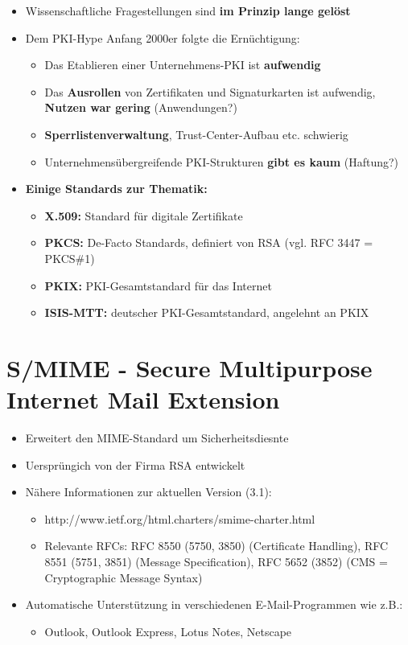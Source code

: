 \documentclass[openany]{book}
\begin{document}
\begin{itemize}
    \item Wissenschaftliche Fragestellungen sind \textbf{im Prinzip lange gelöst}
    \item Dem PKI-Hype Anfang 2000er folgte die Ernüchtigung:
    \begin{itemize}
        \item Das Etablieren einer Unternehmens-PKI ist \textbf{aufwendig}
        \item Das \textbf{Ausrollen} von Zertifikaten und Signaturkarten ist aufwendig, \textbf{Nutzen war gering} (Anwendungen?)
        \item \textbf{Sperrlistenverwaltung}, Trust-Center-Aufbau etc. schwierig
        \item Unternehmensübergreifende PKI-Strukturen \textbf{gibt es kaum} (Haftung?)
    \end{itemize}
    \item \textbf{Einige Standards zur Thematik:}
    \begin{itemize}
        \item \textbf{X.509:} Standard für digitale Zertifikate
        \item \textbf{PKCS:} De-Facto Standards, definiert von RSA (vgl. RFC 3447 = PKCS\#1)
        \item \textbf{PKIX:} PKI-Gesamtstandard für das Internet
        \item \textbf{ISIS-MTT:} deutscher PKI-Gesamtstandard, angelehnt an PKIX
    \end{itemize}
\end{itemize}

\section{S/MIME - Secure Multipurpose Internet Mail Extension}

\begin{itemize}
    \item Erweitert den MIME-Standard um Sicherheitsdiesnte
    \item Uersprüngich von der Firma RSA entwickelt
    \item Nähere Informationen zur aktuellen Version (3.1):
    \begin{itemize}
        \item http://www.ietf.org/html.charters/smime-charter.html
        \item Relevante RFCs: RFC 8550 (5750, 3850) (Certificate Handling), RFC 8551 (5751, 3851) (Message Specification), RFC 5652 (3852) (CMS = Cryptographic Message Syntax)
    \end{itemize}
    \item Automatische Unterstützung in verschiedenen E-Mail-Programmen wie z.B.:
    \begin{itemize}
        \item Outlook, Outlook Express, Lotus Notes, Netscape
    \end{itemize}
\end{itemize}
\end{document}
